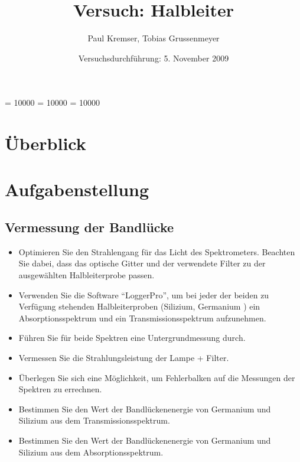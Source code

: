 \documentclass[12pt]{article}
\newcommand{\changefont}[3]{
\fontfamily{#1} \fontseries{#2} \fontshape{#3} \selectfont}
\begin{document}
\clubpenalty = 10000
\widowpenalty = 10000 
\displaywidowpenalty = 10000

\onehalfspacing
\changefont{ptm}{m}{n} 

\begin{titlepage}
\author{Paul Kremser, Tobias Grussenmeyer}
\title{Versuch: Halbleiter}
\date{Versuchsdurchführung: 5. November 2009} 
\maketitle
\thispagestyle{empty}
\end{titlepage}


\tableofcontents
\thispagestyle{empty}
\newpage
{}
\section{Überblick}

\section{Aufgabenstellung}
\subsection{Vermessung der Bandlücke}
\begin{itemize}
 \item Optimieren Sie den Strahlengang für das Licht des Spektrometers. Beachten
Sie dabei, dass das optische Gitter und der verwendete Filter zu der
ausgewählten Halbleiterprobe passen.
 \item Verwenden Sie die Software “LoggerPro”, um bei jeder der beiden zu
Verfügung stehenden Halbleiterproben (Silizium, Germanium ) ein
Absorptionsspektrum und ein Transmissionsspektrum aufzunehmen.
 \item Führen Sie für beide Spektren eine Untergrundmessung durch.
 \item Vermessen Sie die Strahlungsleistung der Lampe + Filter.
 \item Überlegen Sie sich eine Möglichkeit, um Fehlerbalken auf die Messungen der
Spektren zu errechnen.
 \item Bestimmen Sie den Wert der Bandlückenenergie von Germanium und
Silizium aus dem Transmissionsspektrum.
 \item Bestimmen Sie den Wert der Bandlückenenergie von Germanium und
Silizium aus dem Absorptionsspektrum.
\end{itemize}
\end{document}
